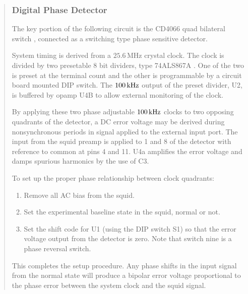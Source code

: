 
\begin{quotation}

\subsubsection{Digital Phase Detector}

The key portion of the following circuit is the CD4066 quad bilateral switch%
\cite{harris_semiconductor}, 
connected as a switching type phase sensitive detector. 

System timing is derived from a $25.6\,\mathrm{MHz}$ 
crystal clock\cite{spk_electronics}.  The clock is 
divided by two presetable 8 bit dividers, type 74ALS\-867A%
\cite{texas_instruments}.  One of the 
two is preset at the terminal count and the other is programmable by a 
circuit board mounted DIP switch.  The $100\,\mathrm{kHz}$ 
output of the preset divider,
U2, is buffered by opamp U4B to allow external monitoring of the clock.

By applying these two phase adjustable $100\,\mathrm{kHz}$ clocks to two opposing 
quadrants of the detector, a DC error voltage may be derived during 
nonsynchronous periods in signal applied to the external input port.  
The input from the squid preamp is applied to 1 and 8 of the detector 
with reference to common at pins 4 and 11.  U4a amplifies the error 
voltage and damps spurious harmonics by the use of  C3.

To set up the proper phase relationship between clock quadrants:

\begin{enumerate}

\item 	Remove all AC bias from the squid.

\item	Set the experimental baseline state in the squid, normal or not.

\item	Set the shift code for U1 (using the DIP switch S1) so  that the 
error voltage output from the 
detector is zero.  Note that switch nine is a phase reversal switch.

\end{enumerate}

This completes the setup procedure.  Any phase shifts in the input 
signal from the normal state will produce a bipolar error voltage 
proportional to the phase error between the system clock and the 
squid signal.

\end{quotation}
